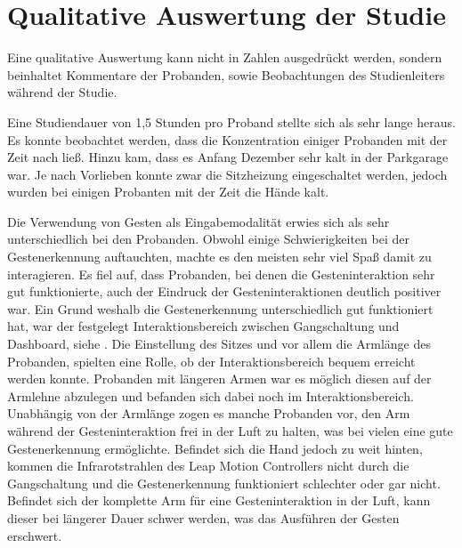 \section[Qualitative Auswertung]{Qualitative Auswertung der Studie}
Eine qualitative Auswertung kann nicht in Zahlen ausgedrückt werden, sondern beinhaltet Kommentare der Probanden, sowie Beobachtungen des Studienleiters während der Studie.

Eine Studiendauer von 1,5 Stunden pro Proband stellte sich als sehr lange heraus.
Es konnte beobachtet werden, dass die Konzentration einiger Probanden mit der Zeit nach ließ.
Hinzu kam, dass es Anfang Dezember sehr kalt in der Parkgarage war.
Je nach Vorlieben konnte zwar die Sitzheizung eingeschaltet werden, jedoch wurden bei einigen Probanten mit der Zeit die Hände kalt.

Die Verwendung von Gesten als Eingabemodalität erwies sich als sehr unterschiedlich bei den Probanden.
Obwohl einige Schwierigkeiten bei der Gestenerkennung auftauchten, machte es den meisten sehr viel Spaß damit zu interagieren.
Es fiel auf, dass Probanden, bei denen die Gesteninteraktion sehr gut funktionierte, auch der Eindruck der Gesteninteraktionen deutlich positiver war.
Ein Grund weshalb die Gestenerkennung unterschiedlich gut funktioniert hat, war der festgelegt Interaktionsbereich zwischen Gangschaltung und Dashboard, siehe .
Die Einstellung des Sitzes und vor allem die Armlänge des Probanden, spielten eine Rolle, ob der Interaktionsbereich bequem erreicht werden konnte.
Probanden mit längeren Armen war es möglich diesen auf der Armlehne abzulegen und befanden sich dabei noch im Interaktionsbereich.
Unabhängig von der Armlänge zogen es manche Probanden vor, den Arm während der Gesteninteraktion frei in der Luft zu halten, was bei vielen eine gute Gestenerkennung ermöglichte.
Befindet sich die Hand jedoch zu weit hinten, kommen die Infrarotstrahlen des Leap Motion Controllers nicht durch die Gangschaltung und die Gestenerkennung funktioniert schlechter oder gar nicht.
Befindet sich der komplette Arm für eine Gesteninteraktion in der Luft, kann dieser bei längerer Dauer schwer werden, was das Ausführen der Gesten erschwert.

